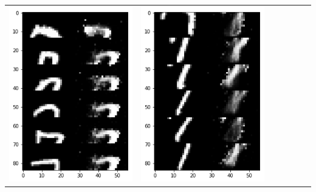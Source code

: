 \documentclass[12pt]{report} %
\begin{document}
\begin{tabular}{m{0.7cm}m{2.4cm}m{2.4cm}m{2.4cm}m{2.4cm}m{2.4cm}m{2.4cm}}
\includegraphics[scale=0.3]{pictures/M1_7_up.png} & \includegraphics[scale=0.3]{pictures/M1_7_down.png} &

\end{tabular}
\end{document}
